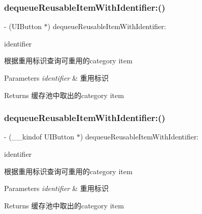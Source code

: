 \subsubsection{\texorpdfstring{dequeue\+Reusable\+Item\+With\+Identifier\+:()}{dequeueReusableItemWithIdentifier:()}\hspace{0.1cm}{\footnotesize\ttfamily [1/3]}}
{\footnotesize\ttfamily -\/ (U\+I\+Button $\ast$) dequeue\+Reusable\+Item\+With\+Identifier\+: \begin{DoxyParamCaption}\item[{(N\+S\+String $\ast$)}]{identifier }\end{DoxyParamCaption}}

根据重用标识查询可重用的category item


\begin{DoxyParams}{Parameters}
{\em identifier} & 重用标识\\
\hline
\end{DoxyParams}
\begin{DoxyReturn}{Returns}
缓存池中取出的category item 
\end{DoxyReturn}
\mbox{\label{interface_v_t_menu_bar_a7b6343150eb89027e85a4b7eae6d778d}} 
\subsubsection{\texorpdfstring{dequeue\+Reusable\+Item\+With\+Identifier\+:()}{dequeueReusableItemWithIdentifier:()}\hspace{0.1cm}{\footnotesize\ttfamily [2/3]}}
{\footnotesize\ttfamily -\/ (\+\_\+\+\_\+kindof U\+I\+Button $\ast$) dequeue\+Reusable\+Item\+With\+Identifier\+: \begin{DoxyParamCaption}\item[{(N\+S\+String $\ast$)}]{identifier }\end{DoxyParamCaption}}

根据重用标识查询可重用的category item


\begin{DoxyParams}{Parameters}
{\em identifier} & 重用标识\\
\hline
\end{DoxyParams}
\begin{DoxyReturn}{Returns}
缓存池中取出的category item 
\end{DoxyReturn}
\mbox{\label{interface_v_t_menu_bar_a7b6343150eb89027e85a4b7eae6d778d}} 
